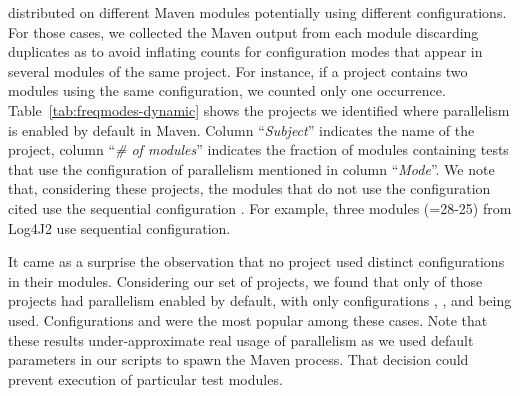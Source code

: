 distributed on different Maven modules potentially using different
configurations.  For those cases, we collected the Maven output from
each module discarding duplicates as to avoid inflating counts for
configuration modes that appear in several modules of the same
project. For instance, if a project contains two modules using the
same configuration, we counted only one occurrence.
Table~\ref{tab:freqmodes-dynamic} shows the projects we identified
where parallelism is enabled by default in Maven.  Column
``\emph{Subject}'' indicates the name of the project, column
``\emph{\# of modules}'' indicates the fraction of modules containing
tests that use the configuration of parallelism mentioned in column
``\emph{Mode}''.  We note that, considering these projects, the
modules that do not use the configuration cited use the sequential
configuration \Seq{}.  For example, three modules (=28-25) from Log4J2
use sequential configuration.

It came as a surprise the observation that
no project used distinct configurations in their modules. Considering
our set of \numMedLong{} projects, we found that only
\textbf{\numProjectsPar{}} of those projects had parallelism enabled
by default, with only configurations \ParClassSeqMeth{},
\ParClassParMeth{}, and \ForkSeq{} being used.  Configurations
\ParClassParMeth{} and \ForkSeq{} were the most popular among these
cases.  Note that these results under-approximate real usage of
parallelism as we used default parameters in our scripts to spawn the
Maven process.  That decision could prevent execution of particular
test modules.

